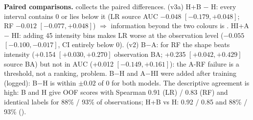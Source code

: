 \textbf{Paired comparisons.}  collects the paired differences. \Primary{} (v3a) H+B $-$ H: every interval
contains 0 or lies below it (LR source AUC $-0.048$ $[-0.179,+0.048]$; RF $-0.012$ $[-0.077,+0.048]$) $\Rightarrow$
information beyond the two colours is \NotDetected. \Secondary{} HI+A $-$ HI: adding 45 intensity bins makes LR worse at the
observation level ($-0.055$ $[-0.100,-0.017]$, CI entirely below 0). \Primary{} (v2) B$-$A: for RF the shape beats
intensity (+0.154 $[+0.030,+0.270]$ observation BA; +0.235 $[+0.042,+0.429]$ source BA) but not in AUC (+0.012
$[-0.149,+0.161]$): the A-RF failure is a threshold, not a ranking, problem. \PostHoc{} B$-$H and A$-$HI were added after
training (logged): B$-$H is within $\pm0.02$ of 0 for both models. The descriptive agreement is high: B and H give OOF
scores with Spearman 0.91 (LR) / 0.83 (RF) and identical labels for 88\% / 93\% of observations; H+B vs H: 0.92 / 0.85 and
88\% / 93\% ().

